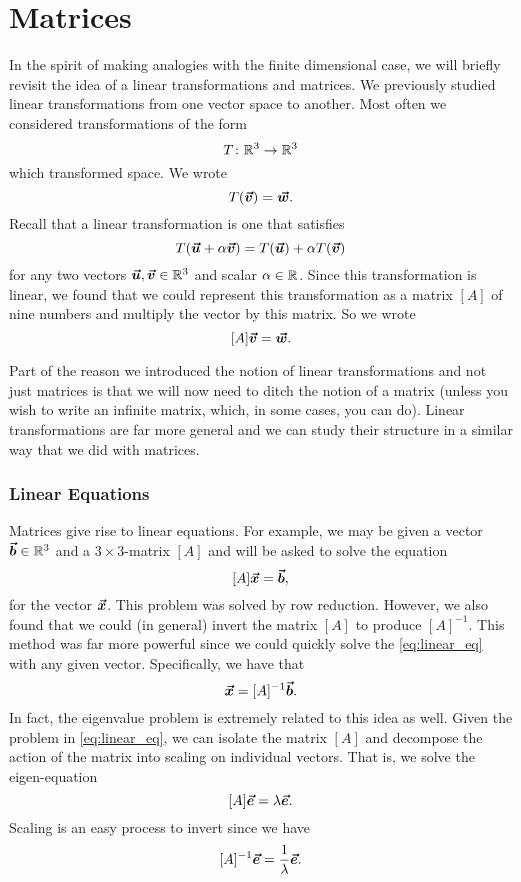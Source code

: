 \section{Matrices}
In the spirit of making analogies with the finite dimensional case, we will briefly revisit the idea of a linear transformations and matrices.  We previously studied linear transformations from one vector space to another. Most often we considered transformations of the form
\[
T \colon \mathbb{R}^3 \to \mathbb{R}^3
\]
which transformed space. We wrote
\[
T(\boldsymbol{\boldsymbol{\vec{v}}})=\boldsymbol{\boldsymbol{\vec{w}}}.
\]
Recall that a linear transformation is one that satisfies
\[
T(\boldsymbol{\boldsymbol{\vec{u}}}+\alpha \boldsymbol{\boldsymbol{\vec{v}}}) = T(\boldsymbol{\boldsymbol{\vec{u}}})+\alpha T(\boldsymbol{\boldsymbol{\vec{v}}})
\]
for any two vectors $\boldsymbol{\boldsymbol{\vec{u}}},\boldsymbol{\boldsymbol{\vec{v}}} \in \mathbb{R}^3$ and scalar $\alpha \in \mathbb{R}$. Since this transformation is linear, we found that we could represent this transformation as a matrix $[A]$ of nine numbers and multiply the vector by this matrix. So we wrote
\[
[A]\boldsymbol{\boldsymbol{\vec{v}}} = \boldsymbol{\boldsymbol{\vec{w}}}.
\]

Part of the reason we introduced the notion of linear transformations and not just matrices is that we will now need to ditch the notion of a matrix (unless you wish to write an infinite matrix, which, in some cases, you can do). Linear transformations are far more general and we can study their structure in a similar way that we did with matrices. 

\subsubsection{Linear Equations}
Matrices give rise to linear equations.  For example, we may be given a vector $\boldsymbol{\vec{b}} \in \mathbb{R}^3$ and a $3\times 3$-matrix $[A]$ and will be asked to solve the equation
\begin{equation}
\label{eq:linear_eq}
[A]\boldsymbol{\boldsymbol{\vec{x}}} = \boldsymbol{\vec{b}},
\end{equation}
for the vector $\boldsymbol{\boldsymbol{\vec{x}}}$. This problem was solved by row reduction.  However, we also found that we could (in general) invert the matrix $[A]$ to produce $[A]^{-1}$.  This method was far more powerful since we could quickly solve the \ref{eq:linear_eq} with any given vector. Specifically, we have that
\[
\boldsymbol{\boldsymbol{\vec{x}}} = [A]^{-1}\boldsymbol{\vec{b}}.
\]
In fact, the eigenvalue problem is extremely related to this idea as well.   Given the problem in \ref{eq:linear_eq}, we can isolate the matrix $[A]$ and decompose the action of the matrix into scaling on individual vectors. That is, we solve the eigen-equation
\[
[A]\boldsymbol{\vec{e}} = \lambda \boldsymbol{\vec{e}}.
\]
Scaling is an easy process to invert since we have
\[
[A]^{-1}\boldsymbol{\vec{e}} = \frac{1}{\lambda} \boldsymbol{\vec{e}}.
\]

